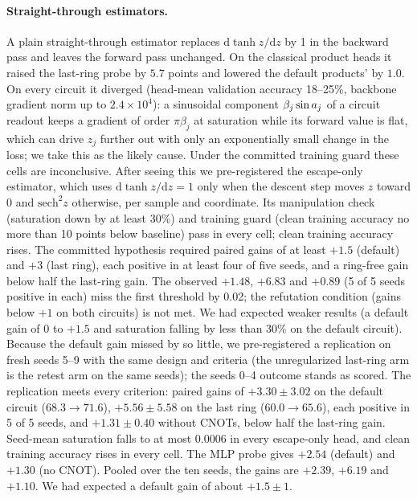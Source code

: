 \paragraph{Straight-through estimators.} A plain straight-through estimator replaces
$\mathrm{d}\tanh z/\mathrm{d}z$ by 1 in the backward pass and leaves the forward pass unchanged. On the
classical product heads it raised the last-ring probe by $5.7$ points and lowered the default products'
by $1.0$. On every circuit it diverged (head-mean validation accuracy 18--25\%, backbone gradient norm up to $2.4\times10^4$): a sinusoidal component $\beta_j\sin a_{j}$ of a circuit readout keeps a gradient of order $\pi\beta_j$ at saturation while its forward value is flat, which can drive $z_j$ further out with only an exponentially small change in the loss; we take this as the likely cause.
Under the committed training guard these cells are inconclusive. After seeing this we pre-registered
the escape-only estimator, which uses $\mathrm{d}\tanh z/\mathrm{d}z=1$ only when the descent step
moves $z$ toward 0 and $\mathrm{sech}^2z$ otherwise, per sample and coordinate. Its manipulation check
(saturation down by at least 30\%) and training guard (clean training accuracy no more than 10 points
below baseline) pass in every cell; clean training accuracy rises. The committed hypothesis required
paired gains of at least $+1.5$ (default) and $+3$ (last ring), each positive in at least four of five
seeds, and a ring-free gain below half the last-ring gain. The observed $+1.48$, $+6.83$ and $+0.89$
(5 of 5 seeds positive in each) miss the first threshold by 0.02; the refutation condition (gains below
$+1$ on both circuits) is not met. We had expected weaker results (a default gain of 0 to $+1.5$ and
saturation falling by less than 30\% on the default circuit).
Because the default gain missed by so little, we pre-registered a replication on fresh seeds 5--9 with the same design and criteria
(the unregularized last-ring arm is the retest arm on the same seeds); the seeds 0--4 outcome stands as scored.
The replication meets every criterion: paired gains of $+3.30\pm3.02$ on the default circuit
($68.3\to71.6$), $+5.56\pm5.58$ on the last ring ($60.0\to65.6$), each positive in 5 of 5 seeds, and
$+1.31\pm0.40$ without CNOTs, below half the last-ring gain. Seed-mean saturation falls to at most $0.0006$ in
every escape-only head, and clean training accuracy rises in every cell. The MLP probe gives $+2.54$ (default) and $+1.30$ (no CNOT).
Pooled over the ten seeds, the gains are $+2.39$, $+6.19$ and $+1.10$. We had expected a default gain of about $+1.5\pm1$.
